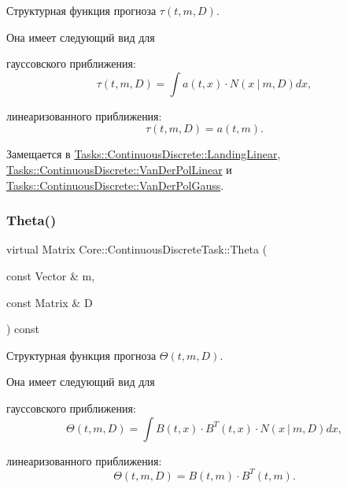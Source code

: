 Структурная функция прогноза $\tau(t, m, D)$. 

Она имеет следующий вид для


\begin{DoxyItemize}
\item гауссовского приближения\+: \[\tau(t, m, D) = \int a(t,x)\cdot N(x\ |\ m, D)dx,\]
\item линеаризованного приближения\+: \[\tau(t, m, D) = a(t, m).\] 
\end{DoxyItemize}

Замещается в \hyperlink{class_tasks_1_1_continuous_discrete_1_1_landing_linear_a1ee11cced65180b2a055b8ca848ef4e0}{Tasks\+::\+Continuous\+Discrete\+::\+Landing\+Linear}, \hyperlink{class_tasks_1_1_continuous_discrete_1_1_van_der_pol_linear_a5b9245d9f403e615a971f2e8009926e6}{Tasks\+::\+Continuous\+Discrete\+::\+Van\+Der\+Pol\+Linear} и \hyperlink{class_tasks_1_1_continuous_discrete_1_1_van_der_pol_gauss_acfe935d9f4f452f3e10cb5f41fc8530a}{Tasks\+::\+Continuous\+Discrete\+::\+Van\+Der\+Pol\+Gauss}.

\hypertarget{class_core_1_1_continuous_discrete_task_a961cc49fd0c72ba0a211bb4913ca3ece}{}\label{class_core_1_1_continuous_discrete_task_a961cc49fd0c72ba0a211bb4913ca3ece} 
\subsubsection{\texorpdfstring{Theta()}{Theta()}}
{\footnotesize\ttfamily virtual Matrix Core\+::\+Continuous\+Discrete\+Task\+::\+Theta (\begin{DoxyParamCaption}\item[{const Vector \&}]{m,  }\item[{const Matrix \&}]{D }\end{DoxyParamCaption}) const\hspace{0.3cm}{\ttfamily [pure virtual]}}



Структурная функция прогноза $\Theta(t,m,D)$. 

Она имеет следующий вид для


\begin{DoxyItemize}
\item гауссовского приближения\+: \[\Theta(t,m,D) = \int B(t,x)\cdot B^T(t,x)\cdot N(x\ |\ m,D)dx,\]
\item линеаризованного приближения\+: \[\Theta(t,m,D) = B(t,m)\cdot B^T(t,m).\] 
\end{DoxyItemize}

